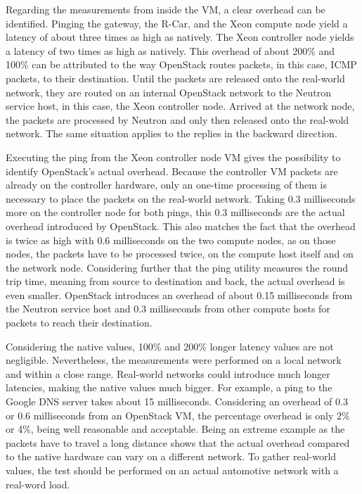             \noindent Regarding the measurements from inside the \ac{VM}, a clear overhead can be identified.
            Pinging the gateway, the R-Car, and the Xeon compute node yield a latency of about three times as high as natively.
            The Xeon controller node yields a latency of two times as high as natively.
            This overhead of about 200\% and 100\% can be attributed to the way OpenStack routes packets, in this case, ICMP packets, to their destination.
            Until the packets are released onto the real-world network, they are routed on an internal OpenStack network to the Neutron service host, in this case, the Xeon controller node.
            Arrived at the network node, the packets are processed by Neutron and only then released onto the real-wold network.
            The same situation applies to the replies in the backward direction.
            
            \noindent Executing the ping from the Xeon controller node VM gives the possibility to identify OpenStack's actual overhead.
            Because the controller VM packets are already on the controller hardware, only an one-time processing of them is necessary to place the packets on the real-world network.
            Taking 0.3 milliseconds more on the controller node for both pings, this 0.3 milliseconds are the actual overhead introduced by OpenStack.
            This also matches the fact that the overhead is twice as high with 0.6 milliseconds on the two compute nodes, as on those nodes, the packets have to be processed twice, on the compute host itself and on the network node.
            Considering further that the ping utility measures the round trip time, meaning from source to destination and back, the actual overhead is even smaller.
            OpenStack introduces an overhead of about 0.15 milliseconds from the Neutron service host and 0.3 milliseconds from other compute hosts for packets to reach their destination. 
            
            \noindent Considering the native values, 100\% and 200\% longer latency values are not negligible.
            Nevertheless, the measurements were performed on a local network and within a close range. 
            Real-world networks could introduce much longer latencies, making the native values much bigger.
            For example, a ping to the Google DNS server takes about 15 milliseconds.
            Considering an overhead of 0.3 or 0.6 milliseconds from an OpenStack \ac{VM}, the percentage overhead is only 2\% or 4\%, being well reasonable and acceptable.
            Being an extreme example as the packets have to travel a long distance shows that the actual overhead compared to the native hardware can vary on a different network.
            To gather real-world values, the test should be performed on an actual automotive network with a real-word load.

